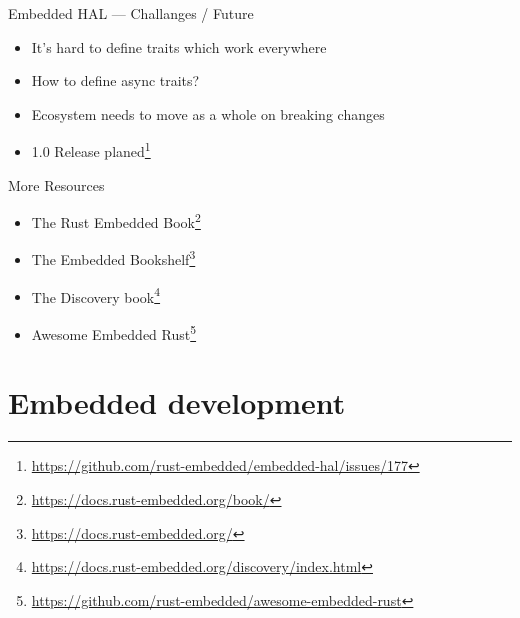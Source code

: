 \documentclass[aspectratio=1610,14pt,t]{beamer}
\begin{document}
\begin{frame}[c]{Embedded HAL --- Challanges / Future}
  \begin{itemize}
  \item It's hard to define traits which work everywhere

  \item How to define async traits?
  \item Ecosystem needs to move as a whole on breaking changes
  \item 1.0 Release planed\footnote{\url{https://github.com/rust-embedded/embedded-hal/issues/177}}
  \end{itemize}
\end{frame}

\begin{frame}[c]{More Resources}
  \begin{itemize}
    \item The Rust Embedded Book\footnote{\url{https://docs.rust-embedded.org/book/}}
    \item The Embedded Bookshelf\footnote{\url{https://docs.rust-embedded.org/}}
    \item The Discovery book\footnote{\url{https://docs.rust-embedded.org/discovery/index.html}}
    \item Awesome Embedded Rust\footnote{\url{https://github.com/rust-embedded/awesome-embedded-rust}}
  \end{itemize}
\end{frame}

\section{Embedded development}
\end{document}
